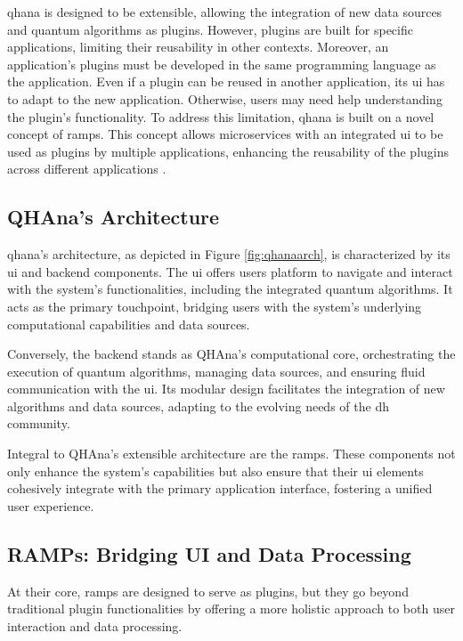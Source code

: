 \documentclass[
  a4paper,  %
  twoside,  %
  bibliography=totoc,
  headsepline,
  cleardoublepage=empty,
  parskip=half,
  draft=false
]{scrbook}
\begin{document}
\gls{qhana} is designed to be extensible, allowing the integration of new data sources and quantum algorithms as plugins.
However, plugins are built for specific applications, limiting their reusability in other contexts.
Moreover, an application's plugins must be developed in the same programming language as the application.
Even if a plugin can be reused in another application, its \gls{ui} has to adapt to the new application.
Otherwise, users may need help understanding the plugin's functionality.
To address this limitation, \gls{qhana} is built on a novel concept of \glspl{ramp}.
This concept allows microservices with an integrated \gls{ui} to be used as plugins by multiple applications, enhancing the reusability of the plugins across different applications \cite{Buehler2022}.

\subsection{QHAna's Architecture}
\label{subsec:qhanaArchitecture}
\gls{qhana}'s architecture, as depicted in Figure \ref{fig:qhanaarch}, is characterized by its \gls{ui} and backend components.
The \gls{ui} offers users platform to navigate and interact with the system's functionalities, including the integrated quantum algorithms.
It acts as the primary touchpoint, bridging users with the system's underlying computational capabilities and data sources.

Conversely, the backend stands as QHAna's computational core, orchestrating the execution of quantum algorithms, managing data sources, and ensuring fluid communication with the \gls{ui}.
Its modular design facilitates the integration of new algorithms and data sources, adapting to the evolving needs of the \gls{dh} community.

Integral to QHAna's extensible architecture are the \glspl{ramp}.
These components not only enhance the system's capabilities but also ensure that their \gls{ui} elements cohesively integrate with the primary application interface, fostering a unified user experience.

\subsection{RAMPs: Bridging UI and Data Processing}
\label{subsec:ramps}

At their core, \glspl{ramp} are designed to serve as plugins, but they go beyond traditional plugin functionalities by offering a more holistic approach to both user interaction and data processing.
\end{document}
